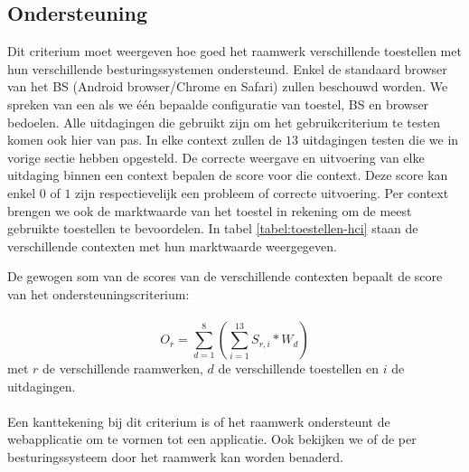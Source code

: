 \subsection{Ondersteuning}
\label{sec:vergelijking-ondersteuning}
Dit criterium moet weergeven hoe goed het raamwerk verschillende toestellen met hun verschillende besturingssystemen ondersteund.
Enkel de standaard browser van het BS (Android browser/Chrome en Safari) zullen beschouwd worden.
We spreken van een  als we één bepaalde configuratie van toestel, BS en browser bedoelen.
Alle uitdagingen die gebruikt zijn om het gebruikcriterium te testen komen ook hier van pas.
In elke context zullen de $13$ uitdagingen testen die we in vorige sectie hebben opgesteld.
De correcte weergave en uitvoering van elke uitdaging binnen een context bepalen de score voor die context.
Deze score kan enkel $0$ of $1$ zijn respectievelijk een probleem of correcte uitvoering.
Per context brengen we ook de marktwaarde van het toestel in rekening om de meest gebruikte toestellen te bevoordelen.
In tabel \ref{tabel:toestellen-hci} staan de verschillende contexten met hun marktwaarde weergegeven.

De gewogen som van de scores van de verschillende contexten bepaalt de score van het ondersteuningscriterium:
\paragraph{}
\begin{equation}
  O_r = \sum_{d=1}^{8}{\left(\sum_{i=1}^{13}S_{r,i}*W_d\right)}
  \label{eq:ondersteuning}
\end{equation}
met $r$ de verschillende raamwerken,  $d$ de verschillende toestellen en $i$ de uitdagingen. 
\paragraph{}
Een kanttekening bij dit criterium is of het raamwerk ondersteunt de webapplicatie om te vormen tot een  applicatie. 
Ook bekijken we of de  per besturingssysteem door het raamwerk kan worden benaderd.

